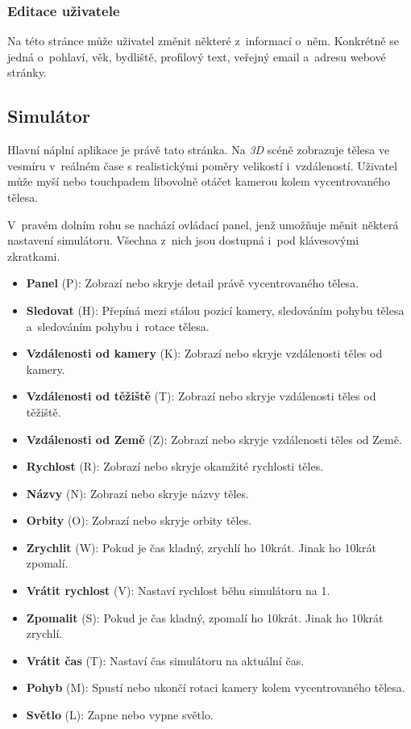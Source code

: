 \documentclass[a4paper,12pt]{article}
\begin{document}
\subsubsection{Editace uživatele}

Na této stránce může uživatel změnit některé z~informací o~něm. Konkrétně se jedná o~pohlaví, věk, bydliště, profilový text, veřejný email a~adresu webové stránky.
	
\subsection{Simulátor}

Hlavní náplní aplikace je právě tato stránka. Na \textit{3D} scéně zobrazuje tělesa ve vesmíru v~reálném čase s realistickými poměry velikostí i~vzdáleností. Uživatel může myší nebo touchpadem libovolně otáčet kamerou kolem vycentrovaného tělesa.

V~pravém dolním rohu se nachází ovládací panel, jenž umožňuje měnit některá nastavení simulátoru. Všechna z~nich jsou dostupná i~pod klávesovými zkratkami.

\begin{itemize}
\item \textbf{Panel} (P): Zobrazí nebo skryje detail právě vycentrovaného tělesa.
\item \textbf{Sledovat} (H): Přepíná mezi stálou pozicí kamery, sledováním pohybu tělesa a~sledováním pohybu i~rotace tělesa.
\item \textbf{Vzdálenosti od kamery} (K): Zobrazí nebo skryje vzdálenosti těles od kamery.
\item \textbf{Vzdálenosti od těžiště} (T): Zobrazí nebo skryje vzdálenosti těles od těžiště.
\item \textbf{Vzdálenosti od Země} (Z): Zobrazí nebo skryje vzdálenosti těles od Země.
\item \textbf{Rychlost} (R): Zobrazí nebo skryje okamžité rychlosti těles.
\item \textbf{Názvy} (N): Zobrazí nebo skryje názvy těles.
\item \textbf{Orbity} (O): Zobrazí nebo skryje orbity těles.
\item \textbf{Zrychlit} (W): Pokud je čas kladný, zrychlí ho 10krát. Jinak ho 10krát zpomalí.
\item \textbf{Vrátit rychlost} (V): Nastaví rychlost běhu simulátoru na 1.
\item \textbf{Zpomalit} (S): Pokud je čas kladný, zpomalí ho 10krát. Jinak ho 10krát zrychlí.
\item \textbf{Vrátit čas} (T): Nastaví čas simulátoru na aktuální čas.
\item \textbf{Pohyb} (M): Spustí nebo ukončí rotaci kamery kolem vycentrovaného tělesa.
\item \textbf{Světlo} (L): Zapne nebo vypne světlo.
\end{itemize}
\end{document}
